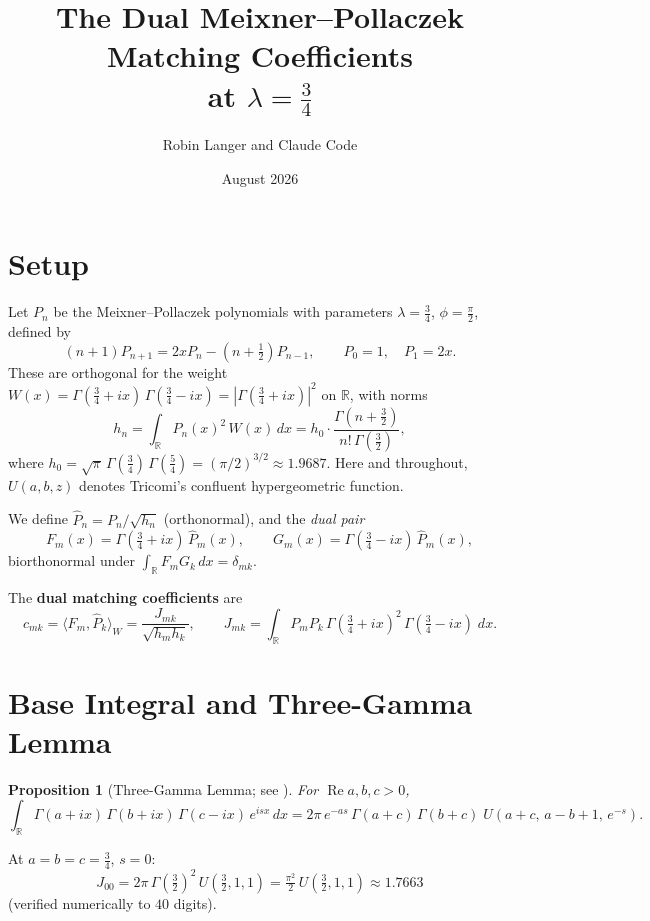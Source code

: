 \documentclass[11pt,a4paper]{article}
\title{\textbf{The Dual Meixner--Pollaczek Matching Coefficients\\
at $\lambda = \tfrac{3}{4}$}}
\author{Robin Langer and Claude Code}
\date{August 2026}
\newtheorem{proposition}{Proposition}[section]
\newcommand{\R}{\mathbb{R}}
\begin{document}
\maketitle

\section{Setup}

Let $P_n$ be the Meixner--Pollaczek polynomials with parameters
$\lambda = \tfrac{3}{4}$, $\phi = \tfrac{\pi}{2}$, defined by
\[
  (n+1) P_{n+1} = 2x P_n - (n + \tfrac12) P_{n-1},
  \qquad P_0 = 1,\quad P_1 = 2x.
\]
These are orthogonal for the weight
$W(x) = \Gamma(\tfrac34+ix)\,\Gamma(\tfrac34-ix) = |\Gamma(\tfrac34+ix)|^2$ on $\R$,
with norms
\[
  h_n = \int_\R P_n(x)^2\, W(x)\, dx
  = h_0 \cdot \frac{\Gamma(n + \tfrac32)}{n!\,\Gamma(\tfrac32)},
\]
where
$h_0 = \sqrt{\pi}\,\Gamma(\tfrac34)\,\Gamma(\tfrac54) = (\pi/2)^{3/2}
\approx 1.9687$.
Here and throughout, $U(a,b,z)$ denotes Tricomi's confluent hypergeometric function.

We define $\widehat{P}_n = P_n / \sqrt{h_n}$ (orthonormal), and the \emph{dual pair}
\[
  F_m(x) = \Gamma(\tfrac34+ix)\,\widehat{P}_m(x), \qquad
  G_m(x) = \Gamma(\tfrac34-ix)\,\widehat{P}_m(x),
\]
biorthonormal under $\int_\R F_m G_k\, dx = \delta_{mk}$.

The \textbf{dual matching coefficients} are
\[
  c_{mk} = \langle F_m, \widehat{P}_k \rangle_W
  = \frac{J_{mk}}{\sqrt{h_m h_k}},
  \qquad
  J_{mk} = \int_\R P_m P_k\,\Gamma(\tfrac34+ix)^2\,\Gamma(\tfrac34-ix)\;dx.
\]

\section{Base Integral and Three-Gamma Lemma}

\begin{proposition}[Three-Gamma Lemma; see \textnormal{\cite{mp14}}]
For $\operatorname{Re} a, b, c > 0$,
\[
  \int_\R \Gamma(a+ix)\,\Gamma(b+ix)\,\Gamma(c-ix)\,e^{isx}\,dx
  = 2\pi\,e^{-as}\,\Gamma(a+c)\,\Gamma(b+c)\;U(a+c,\,a-b+1,\,e^{-s}).
\]
\end{proposition}

At $a = b = c = \tfrac34$, $s = 0$:
\begin{equation}\label{eq:base}
  J_{00} = 2\pi\,\Gamma(\tfrac32)^2\,U(\tfrac32, 1, 1)
  = \tfrac{\pi^2}{2}\, U(\tfrac32, 1, 1)
  \approx 1.7663
\end{equation}
(verified numerically to $40$ digits).
\end{document}
